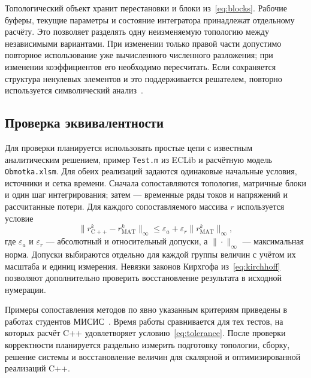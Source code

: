 \documentclass{misisarticle}
\begin{document}
Топологический объект хранит перестановки и блоки из~\eqref{eq:blocks}. Рабочие буферы, текущие параметры и состояние интегратора принадлежат отдельному расчёту. Это позволяет разделять одну неизменяемую топологию между независимыми вариантами. При изменении только правой части допустимо повторное использование уже вычисленного численного разложения; при изменении коэффициентов его необходимо пересчитать. Если сохраняется структура ненулевых элементов и это поддерживается решателем, повторно используется символический анализ~\cite{klu2010}.

\subsection{Проверка эквивалентности}

Для проверки планируется использовать простые цепи с известным аналитическим решением, пример \nolinkurl{Test.m} из ECLib и расчётную модель \mbox{\texttt{Obmotka.xlsm}}. Для обеих реализаций задаются одинаковые начальные условия, источники и сетка времени. Сначала сопоставляются топология, матричные блоки и один шаг интегрирования; затем --- временные ряды токов и напряжений и рассчитанные потери. Для каждого сопоставляемого массива $r$ используется условие
\begin{equation}
  \|r_{\mathrm{C++}}^k-r_{\mathrm{MAT}}^k\|_\infty
  \le \varepsilon_a+\varepsilon_r\|r_{\mathrm{MAT}}^k\|_\infty ,
  \label{eq:tolerance}
\end{equation}
где $\varepsilon_a$ и $\varepsilon_r$ --- абсолютный и относительный допуски, а $\|\cdot\|_\infty$ --- максимальная норма. Допуски выбираются отдельно для каждой группы величин с учётом их масштаба и единиц измерения. Невязки законов Кирхгофа из~\eqref{eq:kirchhoff} позволяют дополнительно проверить восстановление результата в исходной нумерации.

Примеры сопоставления методов по явно указанным критериям приведены в работах студентов МИСИС~\mbox{\cite{podgorny2024,lichko2024}}. Время работы сравнивается для тех тестов, на которых расчёт C++ удовлетворяет условию~\eqref{eq:tolerance}. После проверки корректности планируется раздельно измерить подготовку топологии, сборку, решение системы и восстановление величин для скалярной и оптимизированной реализаций C++.
\end{document}
